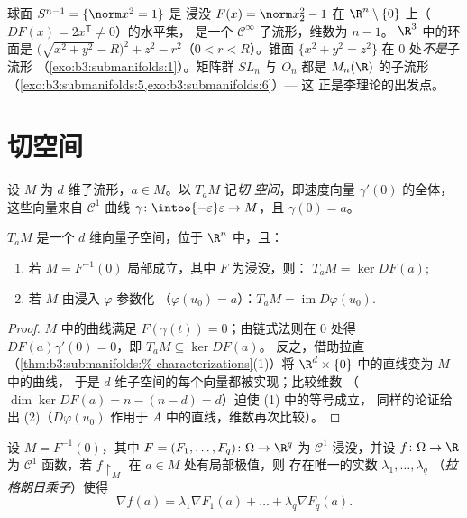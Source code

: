\begin{example}\label{ex:b3:submanifolds:examples}
球面 $S^{n-1} = \{\norm x^2 = 1\}$ 是
浸没 $F(x) = \norm x_2^2 - 1$ 在
$\R^n\setminus\{0\}$ 上（$DF(x) = 2x^{\mathsf T} \ne 0$）的水平集，
是一个 $\mathcal C^\infty$ 子流形，维数为 $n - 1$。
$\R^3$ 中的环面是 $\bigl(\sqrt{x^2 + y^2} -
R\bigr)^2 + z^2 - r^2$（$0 < r < R$）。锥面 $\{x^2 + y^2 =
z^2\}$ 在 $0$ 处\emph{不是}子流形
（\cref{exo:b3:submanifolds:1}）。矩阵群 $SL_n$ 与
$O_n$ 都是 $M_n(\R)$ 的子流形
（\cref{exo:b3:submanifolds:5,exo:b3:submanifolds:6}）--- 这
正是李理论的出发点。
\end{example}

\section{切空间}

\begin{definition}\label{def:b3:submanifolds:tangent}
设 $M$ 为 $d$ 维子流形，$a \in M$。以 $T_aM$ 记\emph{切
空间}，即速度向量
$\gamma'(0)$ 的全体，这些向量来自 $\mathcal C^1$ 曲线 $\gamma \colon
\intoo{-\varepsilon}\varepsilon \to M$，且 $\gamma(0) = a$。
\end{definition}

\begin{proposition}\label{prop:b3:submanifolds:tangent}
$T_aM$ 是一个 $d$ 维向量子空间，位于 $\R^n$ 中，且：
\begin{enumerate}
  \item 若 $M = F^{-1}(0)$ 局部成立，其中 $F$ 为浸没，则：
        $T_aM = \ker DF(a)$;
  \item 若 $M$ 由浸入 $\varphi$ 参数化
        （$\varphi(u_0) = a$）：$T_aM =
        \operatorname{im}D\varphi(u_0)$.
\end{enumerate}
\end{proposition}

\begin{proof}
$M$ 中的曲线满足 $F(\gamma(t)) = 0$；由链式法则在
$0$ 处得 $DF(a)\gamma'(0) = 0$，即 $T_aM \subseteq \ker DF(a)$。
反之，借助拉直（\cref{thm:b3:submanifolds:%
characterizations}(1)）将
$\R^d\times\{0\}$ 中的直线变为 $M$ 中的曲线，
于是 $d$ 维子空间的每个向量都被实现；比较维数
（$\dim\ker DF(a) = n - (n - d) = d$）迫使 (1) 中的等号成立，
同样的论证给出 (2)（$D\varphi(u_0)$
作用于 $A$ 中的直线，维数再次比较）。
\end{proof}

\begin{theorem}[拉格朗日乘子定理]
\label{thm:b3:submanifolds:lagrange}
设 $M = F^{-1}(0)$，其中 $F = (F_1, \dots, F_q) \colon \Omega
\to \R^q$ 为 $\mathcal C^1$ 浸没，并设 $f \colon
\Omega \to \R$ 为 $\mathcal C^1$ 函数，若
$f\restriction_M$ 在 $a \in M$ 处有局部极值，则
存在唯一的实数 $\lambda_1, \dots, \lambda_q$
（\emph{拉格朗日乘子}）使得
\[
\nabla f(a) = \lambda_1\nabla F_1(a) + \dots +
\lambda_q\nabla F_q(a) .
\]
\end{theorem}


